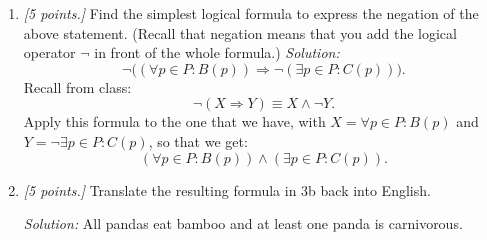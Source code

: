 \documentclass[12pt]{amsart}
\begin{document}
\begin{enumerate}[label=\arabic*.,itemsep=10pt, leftmargin=*]
\begin{enumerate}
            \item 
        \textit{[5 points.]}
            Find the simplest logical formula
                to express the negation of the above statement. 
            (Recall that negation means that you add the logical operator $\neg$ in front of the whole formula.)
            \textit{Solution:}
            $$ \neg \Big( ( \forall p \in P : B(p) ) \Rightarrow 
            \neg (\exists p \in P: C(p)) \Big)
            .$$
            Recall from class:
            $$ \neg (X \Rightarrow Y) \equiv
            X \wedge \neg Y
            .$$
            Apply this formula to the one that we have, with $X = \forall p \in P : B(p)$ and $Y = \neg \exists p \in P: C(p)$, so that we get:
            $$ ( \forall p \in P : B(p) ) \wedge 
             (\exists p \in P: C(p))
            .$$
            
            \item 
        \textit{[5 points.]}
            Translate the resulting formula in 3b back into English. 
            
            \textit{Solution:}
            All pandas eat bamboo and at least one panda is carnivorous.
        \end{enumerate}
\end{enumerate}
\end{document}
